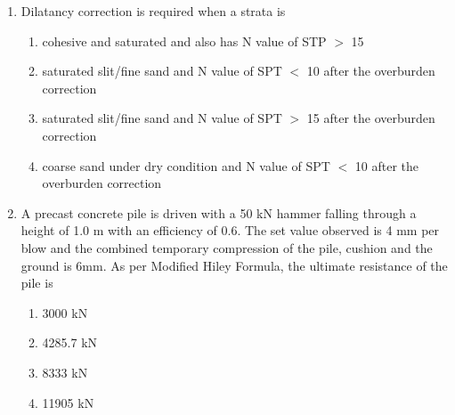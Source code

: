 \documentclass[journal,12pt,twocolumn]{IEEEtran}
\theoremstyle{remark}
\begin{document}
\begin{enumerate}
\item Dilatancy correction is required when a strata is 
	\begin{enumerate}
		\item cohesive and saturated and also has N value of STP $>$ 15
		\item saturated slit/fine sand and N value of SPT $<$ 10 after the overburden correction	
		\item saturated slit/fine sand and N value of SPT $>$ 15 after the overburden correction			 \item coarse sand under dry condition and N value of SPT $<$ 10 after the overburden correction	
	\end{enumerate}

\item A precast concrete pile is driven with a 50 kN hammer falling through a height of 1.0 m with an efficiency of 0.6. The set value observed is 4 mm per blow and the combined temporary compression of the pile, cushion and the ground is 6mm. As per Modified Hiley Formula, the ultimate resistance of the pile is
	\begin{enumerate}
		\item 3000 kN
		\item 4285.7 kN
	    \item 8333 kN
		\item 11905 kN
	\end{enumerate}






\end{enumerate}
\end{document}

